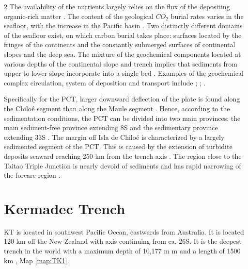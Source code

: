 \documentclass[11pt,a4paper]{report}
\begin{document}
\begin{multicols}{2}
The availability of the nutrients largely relies on the flux of the depositing organic-rich matter \cite{Turnewitschetal2014}. The content of the geological $CO_{2}$ burial rates varies in the seafloor, with the increase in the Pacific basin \cite{Cartapanisetal2018}. Two distinctly different domains of the seafloor exist, on which carbon burial takes place: surfaces located by the fringes of the continents and the constantly submerged surfaces of continental slopes and the deep sea. The mixture of the geochemical components located at various depths of the continental slope and trench implies that sediments from upper to lower slope incorporate into a single bed \cite{Voelkeretal2008}. Examples of the geochemical complex circulation, system of deposition and transport include \cite{SattarovaAksentov2018}; \cite{Yangetal2018}; \cite{Lehuetal2015}.  

Specifically for the \ac{PCT}, larger downward deflection of the plate is found along the Chiloé segment than along the Maule segment \cite{ContrerasReyesetal2013}. Hence, according to the sedimentation conditions, the \ac{PCT} can be divided into two main provinces: the main sediment-free province extending 8\degree\space S and the sedimentary province extending 33\degree\space S \cite{Hayes}. The margin off Isla de Chiloé is characterized by a largely sedimented segment of the \ac{PCT}. This is caused by the extension of turbidite deposits seaward reaching 250 km from the trench axis \cite{Contreras2007}. The region close to the Taitao Triple Junction is nearly devoid of sediments and has rapid narrowing of the forearc region \cite{Behrmann}. 

\end{multicols}
\pagebreak
\section{Kermadec Trench}
\ac{KT} is located in southwest Pacific Ocean, eastwards from Australia. It is located 120 km off the New Zealand with axis continuing from ca. 26\degree\space S. It is the  deepest trench in the world with a maximum depth of 10,177 m \cite{Jamieson2015} m and a length of 1500 km \cite{Jamiesonetal2011}, Map \ref{map:TK1}. 
\end{document}
